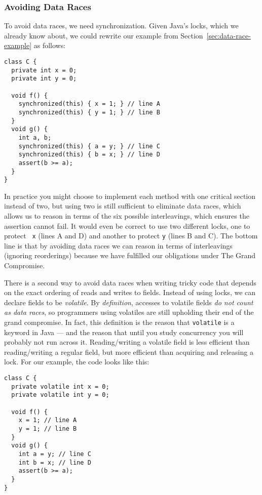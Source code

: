 \documentclass[10pt]{article}
\begin{document}
\subsubsection{Avoiding Data Races}

To avoid data races, we need synchronization.  Given Java's locks,
which we already know about, we could rewrite our example from
Section~\ref{sec:data-race-example} as follows:
\begin{verbatim}
class C {
  private int x = 0;
  private int y = 0;

  void f() {
    synchronized(this) { x = 1; } // line A
    synchronized(this) { y = 1; } // line B
  }
  void g() {
    int a, b;
    synchronized(this) { a = y; } // line C
    synchronized(this) { b = x; } // line D
    assert(b >= a);
  }   
}
\end{verbatim}
In practice you might choose to implement each method with one
critical section instead of two, but using two is still sufficient to
eliminate data races, which allows us to reason in terms of the six
possible interleavings, which ensures the assertion cannot fail.  It
would even be correct to use two different locks, one to protect {\tt
  x} (lines A and D) and another to protect {\tt y} (lines B and C).
The bottom line is that by avoiding data races we can reason in terms
of interleavings (ignoring reorderings) because we have fulfilled our
obligations under The Grand Compromise.

There is a second way to avoid data races when writing tricky code
that depends on the exact ordering of reads and writes to fields.
Instead of using locks, we can declare fields to be \emph{volatile}.
By \emph{definition}, accesses to volatile fields \emph{do not count
  as data races}, so programmers using volatiles are still upholding
their end of the grand compromise.  In fact, this definition is the
reason that {\tt volatile} is a keyword in Java --- and the reason
that until you study concurrency you will probably not run across it.
Reading/writing a volatile field is less efficient than
reading/writing a regular field, but more efficient than acquiring and
releasing a lock.  For our example, the code looks like this:
\begin{verbatim}
class C {
  private volatile int x = 0;
  private volatile int y = 0;

  void f() {
    x = 1; // line A
    y = 1; // line B
  }
  void g() {
    int a = y; // line C
    int b = x; // line D
    assert(b >= a);
  }   
}
\end{verbatim}
\end{document}
